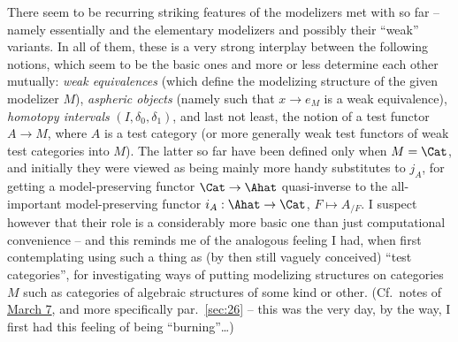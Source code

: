 There seem to be recurring striking features of the modelizers met
with so far -- namely essentially \Cat{} and the elementary modelizers
\Ahat{} and possibly their ``weak'' variants. In all of them, these is
a very strong interplay between the following notions, which seem to
be the basic ones and more or less determine each other mutually:
\emph{weak equivalences} (which define the modelizing structure of the
given modelizer $M$), \emph{aspheric objects} (namely such that
$x\to e_M$ is a weak equivalence), \emph{homotopy intervals}
$(I,\delta_0,\delta_1)$, and last not least, the notion of a test
functor $A \to M$, where $A$ is a test category (or more generally
weak test functors of weak test categories into $M$). The latter so
far have been defined only when $M=\Cat$, and initially they were
viewed as being mainly more handy substitutes to $j_A$, for getting a
model-preserving functor $\Cat\to\Ahat$ quasi-inverse to the
all-important model-preserving functor $i_A:\Ahat\to\Cat$,
$F\mapsto A_{/F}$. I suspect however that their role is a considerably
more basic one than just computational convenience -- and this reminds
me of the analogous feeling I had, when first contemplating using such
a thing as (by then still vaguely conceived) ``test categories'', for
investigating ways of putting modelizing structures on categories $M$
such as categories of algebraic structures of some kind or
other. (Cf.\ notes of \hyperref[date:7.3.]{March 7}, and more
specifically par.\ \ref{sec:26} -- this was the very day, by the way,
I first had this feeling of being ``burning''\ldots)

